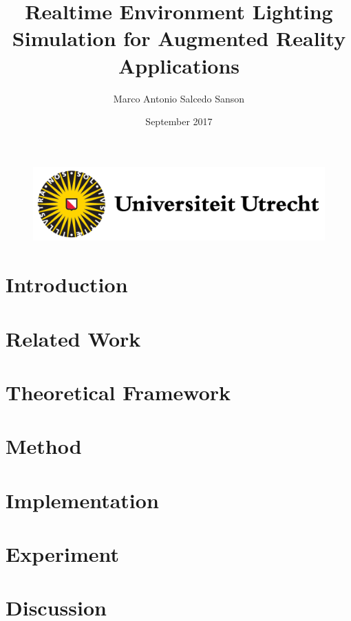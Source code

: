 \documentclass{report}
\title{Realtime Environment Lighting Simulation for Augmented Reality Applications}
\author{Marco Antonio Salcedo Sanson }
\date{September 2017}
\begin{document}
\begin{figure}[t]
\includegraphics[scale = 0.5]{Figures/uu-logo.png}
\end{figure}

\maketitle
\clearpage

\tableofcontents{}
\clearpage

\chapter{Introduction}



\chapter{Related Work}


\chapter{Theoretical Framework}


\chapter{Method}


\chapter{Implementation}


\chapter{Experiment}


\chapter{Discussion}


\clearpage


\nocite{*}

\end{document}
